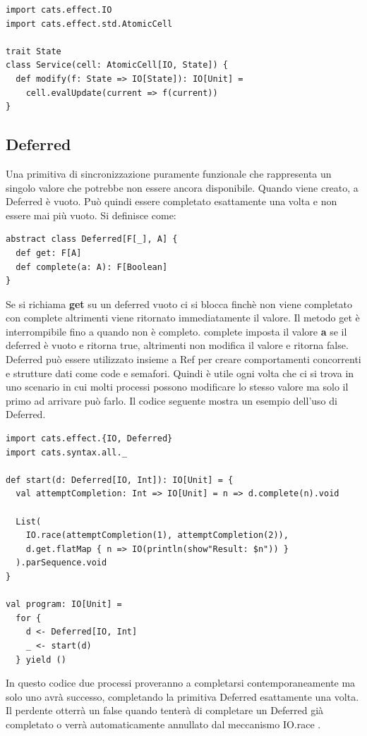 \begin{verbatim}
import cats.effect.IO
import cats.effect.std.AtomicCell

trait State
class Service(cell: AtomicCell[IO, State]) {
  def modify(f: State => IO[State]): IO[Unit] = 
    cell.evalUpdate(current => f(current))
}
\end{verbatim}

\subsection{Deferred}
Una primitiva di sincronizzazione puramente funzionale che rappresenta un singolo valore che potrebbe non essere ancora disponibile. Quando viene creato, a Deferred è vuoto. Può quindi essere completato esattamente una volta e non essere mai più vuoto. Si definisce come:
\begin{verbatim}
abstract class Deferred[F[_], A] {
  def get: F[A]
  def complete(a: A): F[Boolean]
}
\end{verbatim}
\noindent Se si richiama \textbf{get} su un deferred vuoto ci si blocca finchè non viene completato con complete altrimenti viene ritornato immediatamente il valore. Il metodo get è interrompibile fino a quando non è completo. complete imposta il valore \textbf{a} se il deferred è vuoto e ritorna true, altrimenti non modifica il valore e ritorna false. Deferred può essere utilizzato insieme a Ref per creare comportamenti concorrenti e strutture dati come code e semafori. Quindi è utile ogni volta che ci si trova in uno
scenario in cui molti processi possono modificare lo stesso valore ma solo il primo ad
arrivare può farlo. Il codice seguente mostra un esempio dell'uso di Deferred.

\begin{verbatim}
import cats.effect.{IO, Deferred}
import cats.syntax.all._

def start(d: Deferred[IO, Int]): IO[Unit] = {
  val attemptCompletion: Int => IO[Unit] = n => d.complete(n).void

  List(
    IO.race(attemptCompletion(1), attemptCompletion(2)),
    d.get.flatMap { n => IO(println(show"Result: $n")) }
  ).parSequence.void
}

val program: IO[Unit] =
  for {
    d <- Deferred[IO, Int]
    _ <- start(d)
  } yield ()
\end{verbatim}

In questo codice due processi proveranno a completarsi contemporaneamente ma solo uno avrà successo, completando la primitiva Deferred esattamente una volta. Il perdente otterrà un  false quando tenterà di completare un Deferred già completato o verrà automaticamente annullato dal meccanismo IO.race .

